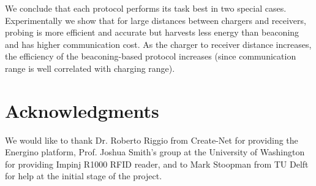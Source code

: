 \documentclass[11pt,draftclsnofoot,journal,onecolumn]{IEEEtran}
\begin{document}
We conclude that each protocol performs its task best in two special cases. Experimentally we show that for large distances between chargers and receivers, probing is more efficient and accurate but harvests less energy than beaconing and has higher communication cost. As the charger to receiver distance increases, the efficiency of the beaconing-based protocol increases (since communication range is well correlated with charging range).

\section*{Acknowledgments}
\label{sec:acknowledgment}

We would like to thank Dr. Roberto Riggio from Create-Net for providing the Energino platform, Prof. Joshua Smith's group at the University of Washington for providing Impinj R1000 RFID reader, and to Mark Stoopman from TU Delft for help at the initial stage of the project.
\end{document}

